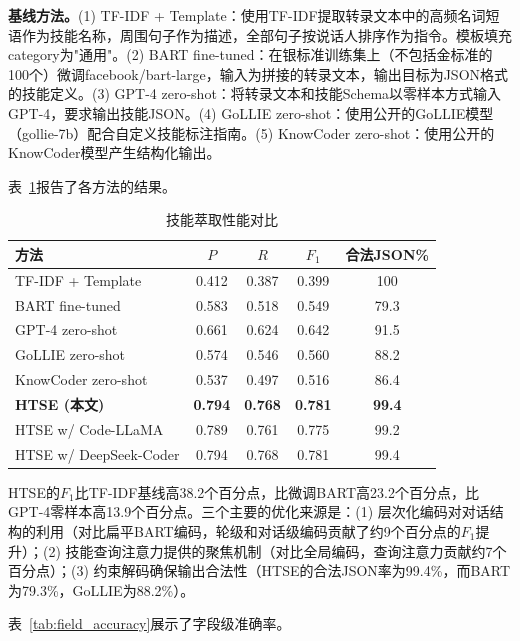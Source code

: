\documentclass[conference]{IEEEtran}
\begin{document}
\textbf{基线方法。}(1) TF-IDF + Template：使用TF-IDF提取转录文本中的高频名词短语作为技能名称，周围句子作为描述，全部句子按说话人排序作为指令。模板填充category为"通用"。(2) BART fine-tuned：在银标准训练集上（不包括金标准的100个）微调facebook/bart-large，输入为拼接的转录文本，输出目标为JSON格式的技能定义。(3) GPT-4 zero-shot：将转录文本和技能Schema以零样本方式输入GPT-4，要求输出技能JSON。(4) GoLLIE zero-shot：使用公开的GoLLIE模型（gollie-7b）配合自定义技能标注指南。(5) KnowCoder zero-shot：使用公开的KnowCoder模型产生结构化输出。

表~\ref{tab:extraction_results}报告了各方法的结果。

\begin{table}[t]
\centering
\caption{技能萃取性能对比}
\label{tab:extraction_results}
\setlength{\tabcolsep}{3pt}
\begin{tabular}{lcccc}
\toprule
方法 & $P$ & $R$ & $F_1$ & 合法JSON\% \\
\midrule
TF-IDF + Template & 0.412 & 0.387 & 0.399 & 100 \\
BART fine-tuned & 0.583 & 0.518 & 0.549 & 79.3 \\
GPT-4 zero-shot & 0.661 & 0.624 & 0.642 & 91.5 \\
GoLLIE zero-shot~\cite{sainz2023gollie} & 0.574 & 0.546 & 0.560 & 88.2 \\
KnowCoder zero-shot~\cite{li2024knowcoder} & 0.537 & 0.497 & 0.516 & 86.4 \\
\textbf{HTSE (本文)} & \textbf{0.794} & \textbf{0.768} & \textbf{0.781} & \textbf{99.4} \\
\midrule
HTSE w/ Code-LLaMA & 0.789 & 0.761 & 0.775 & 99.2 \\
HTSE w/ DeepSeek-Coder & 0.794 & 0.768 & 0.781 & 99.4 \\
\bottomrule
\end{tabular}
\end{table}

HTSE的$F_1$比TF-IDF基线高38.2个百分点，比微调BART高23.2个百分点，比GPT-4零样本高13.9个百分点。三个主要的优化来源是：(1) 层次化编码对对话结构的利用（对比扁平BART编码，轮级和对话级编码贡献了约9个百分点的$F_1$提升）；(2) 技能查询注意力提供的聚焦机制（对比全局编码，查询注意力贡献约7个百分点）；(3) 约束解码确保输出合法性（HTSE的合法JSON率为99.4\%，而BART为79.3\%，GoLLIE为88.2\%）。

表~\ref{tab:field_accuracy}展示了字段级准确率。
\end{document}
